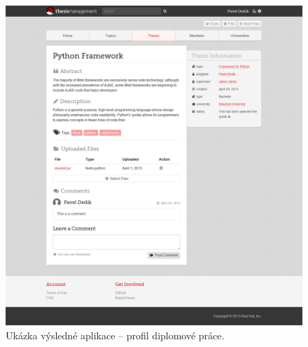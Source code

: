\begin{figure}[htbp]
    \centering
    \includegraphics[width=\textwidth]{images/tms.png}
    \caption{Ukázka výsledné aplikace -- profil diplomové práce.}
    \label{img:tms}
\end{figure}

